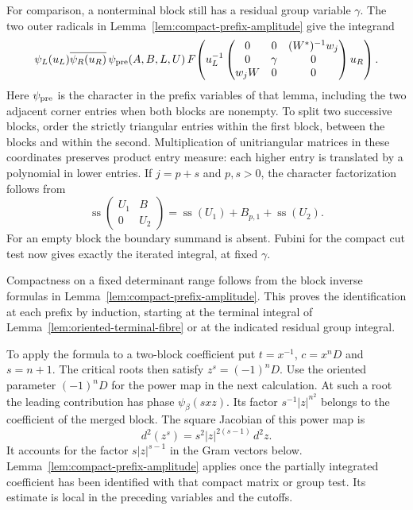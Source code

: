 For comparison, a nonterminal block still has a residual group
variable \(\gamma\). The two outer radicals in
Lemma~\ref{lem:compact-prefix-amplitude} give the integrand
\[
 \psi_L(u_L)\overline{\psi_R(u_R)}\,
 \psi_{\rm pre}(A,B,L,U)\,
 F\!\left(u_L^{-1}
 \begin{pmatrix}0&0&(W^*)^{-1}w_j\\0&\gamma&0\\w_jW&0&0\end{pmatrix}
 u_R\right).
\]
Here \(\psi_{\rm pre}\) is the character in the prefix variables of
that lemma, including the two adjacent corner entries when both
blocks are nonempty. To split two successive blocks, order the
strictly triangular entries within the first block, between the
blocks and within the second. Multiplication of unitriangular
matrices in these coordinates preserves product entry measure:
each higher entry is translated by a polynomial in lower entries.
If \(j=p+s\) and \(p,s>0\), the character factorization follows from
\[
 \operatorname{ss}\!\begin{pmatrix}U_1&B\\0&U_2\end{pmatrix}
   =\operatorname{ss}(U_1)+B_{p,1}+\operatorname{ss}(U_2).
\]
For an empty block the boundary summand is absent. Fubini for the compact cut test
now gives exactly the iterated integral, at fixed \(\gamma\).

Compactness on a fixed determinant range follows from the block
inverse formulas in Lemma~\ref{lem:compact-prefix-amplitude}.
This proves the identification at each prefix by induction, starting
at the terminal integral of Lemma~\ref{lem:oriented-terminal-fibre}
or at the indicated residual group integral.

   To apply the formula to a two-block coefficient put \(t=x^{-1}\), \(c=x^n D\) and \(s=n+1\). The critical roots then satisfy \(z^s=(-1)^nD\). Use the oriented parameter \((-1)^nD\) for the power map in the next calculation. At such a root the leading contribution has phase \(\psi_\beta(sxz)\). Its factor \(s^{-1}|z|^{n^2}\) belongs to the coefficient of the merged block. The square Jacobian of this power map is
\[
                d^2(z^s)=s^2|z|^{2(s-1)}\,d^2z .
\]
It accounts for the factor \(s|z|^{s-1}\) in the Gram vectors below. Lemma~\ref{lem:compact-prefix-amplitude} applies once the partially integrated coefficient has been identified with that compact matrix or group test. Its estimate is local in the preceding variables and the cutoffs.
\label{cor:orbital-germ-1}

